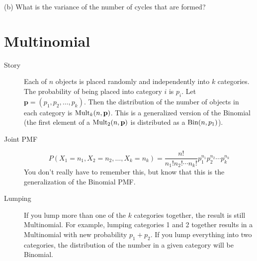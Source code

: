 \documentclass{article}
\begin{document}
(b) What is the variance of the number of cycles that are formed? \\



\section{Multinomial}

\begin{description}

\item[Story] Each of $n$ objects is placed randomly and independently into $k$ categories. The probability of being placed into category $i$ is $p_i$. Let $\mathbf{p} = (p_1, p_2, \dots, p_k)$. Then the distribution of the number of objects in each category is $\textrm{Mult}_k(n, \mathbf{p})$. This is a generalized version of the Binomial (the first element of a $\textrm{Mult}_2(n, \mathbf{p})$ is distributed as a $\textrm{Bin}(n, p_1)$).

\item[Joint PMF] $$P(X_1 = n_1, X_2 = n_2, \dots, X_k = n_k) = \frac{n!}{n_1!n_2!\cdots n_k!}p_1^{n_1}p_2^{n_2}\cdots p_k^{n_k}$$ You don't really have to remember this, but know that this is the generalization of the Binomial PMF.

\item[Lumping] If you lump more than one of the $k$ categories together, the result is still Multinomial. For example, lumping categories 1 and 2 together results in a Multinomial with new probability $p_1 + p_2$. If you lump everything into two categories, the distribution of the number in a given category will be Binomial.

\end{description}
\end{document}
